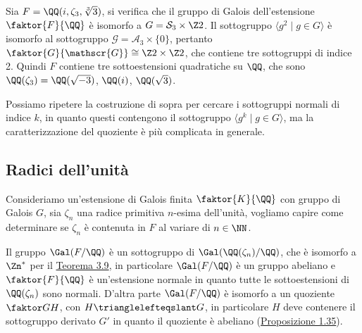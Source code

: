 \documentclass[11pt]{scrartcl}
\begin{document}
\begin{example}
    Sia $F = \QQ(i, \zeta_3, \sqrt[3]3)$, si verifica che il gruppo di Galois
    dell'estensione $\faktor{F}{\QQ}$ è isomorfo a $G = \mathcal{S}_3\times\Z2$.
    Il sottogruppo $\langle g^2 \mid g \in G\rangle$ è isomorfo al sottogruppo
    $\mathscr{G} = \mathcal{A}_3 \times \{0\}$, pertanto $\faktor{G}{\mathscr{G}}
    \cong \Z2\times\Z2$, che contiene tre sottogruppi di indice 2. Quindi 
    $F$ contiene tre sottoestensioni quadratiche su $\QQ$, che sono 
    $\QQ(\zeta_3) = \QQ(\sqrt{-3})$, $\QQ(i)$, $\QQ(\sqrt 3)$.
\end{example}

\begin{remark}
    Possiamo ripetere la costruzione di sopra per cercare i sottogruppi 
    normali di indice $k$, in quanto questi contengono il sottogruppo
    $\langle g^k \mid g \in G\rangle$, ma la caratterizzazione del quoziente
    è più complicata in generale.
\end{remark}

\newpage

\subsection{Radici dell'unità}

Consideriamo un'estensione di Galois finita $\faktor{K}{\QQ}$ con gruppo di 
Galois $G$, sia $\zeta_n$ una radice primitiva $n$-esima dell'unità, vogliamo
capire come determinare se $\zeta_n$ è contenuta in $F$ al variare di $n \in \NN$.

\begin{center}
\end{center}

Il gruppo $\Gal(F/\QQ)$ è un sottogruppo di $\Gal(\QQ(\zeta_n)/\QQ)$, che è
isomorfo a $\Zn^*$ per il \hyperref[teorema3.9]{Teorema 3.9}, in particolare
$\Gal(F/\QQ)$ è un gruppo abeliano e $\faktor{F}{\QQ}$ è un'estensione normale
in quanto tutte le sottoestensioni di $\QQ(\zeta_n)$ sono normali. D'altra 
parte $\Gal(F/\QQ)$ è isomorfo a un quoziente $\faktor G H$, con $H \trianglelefteqslant G$,
in particolare $H$ deve contenere il sottogruppo derivato $G'$ in quanto
il quoziente è abeliano (\hyperref[prop1.35]{Proposizione 1.35}).
\end{document}
